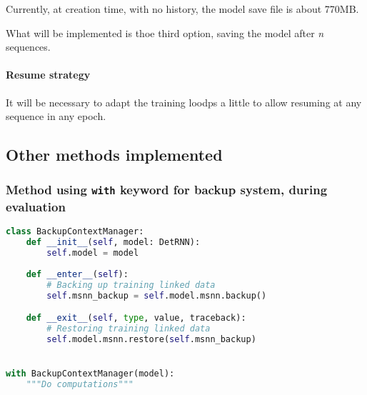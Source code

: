 Currently, at creation time, with no history, the model save file is
about 770MB.

What will be implemented is thoe third option, saving the model after
\emph{n} sequences.

\paragraph{Resume strategy}\label{resume-strategy}

It will be necessary to adapt the training loodps a little to allow
resuming at any sequence in any epoch.

\subsection{Other methods implemented}\label{other-methods-implemented}

\subsubsection{\texorpdfstring{Method using \texttt{with} keyword for
backup system, during
evaluation}{Method using with keyword for backup system, during evaluation}}\label{method-using-with-keyword-for-backup-system-during-evaluation}

\begin{lstlisting}[language=Python]
class BackupContextManager:
    def __init__(self, model: DetRNN):
        self.model = model
        
    def __enter__(self):
        # Backing up training linked data
        self.msnn_backup = self.model.msnn.backup()

    def __exit__(self, type, value, traceback):
        # Restoring training linked data
        self.model.msnn.restore(self.msnn_backup)


with BackupContextManager(model):
    """Do computations"""
\end{lstlisting}

